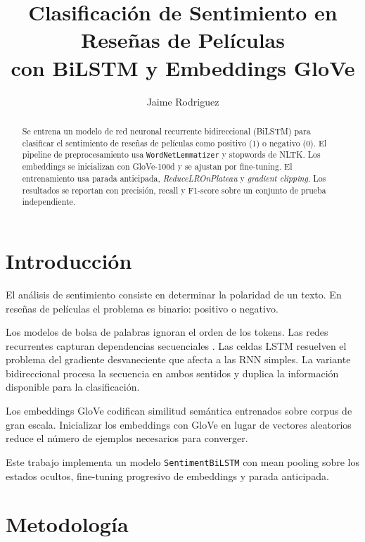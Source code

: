 \documentclass[letterpaper, 10 pt, conference]{ieeeconf}
\title{\LARGE \bf
Clasificaci\'on de Sentimiento en Rese\~nas de Pel\'iculas\\
con BiLSTM y Embeddings GloVe
}
\author{Jaime Rodriguez}
\begin{document}
\maketitle
\thispagestyle{empty}
\pagestyle{empty}

\begin{abstract}
Se entrena un modelo de red neuronal recurrente bidireccional (BiLSTM) para
clasificar el sentimiento de rese\~nas de pel\'iculas como positivo (1) o
negativo (0). El pipeline de preprocesamiento usa \texttt{WordNetLemmatizer}
y stopwords de NLTK. Los embeddings se inicializan con GloVe-100d y se
ajustan por fine-tuning. El entrenamiento usa parada anticipada,
\textit{ReduceLROnPlateau} y \textit{gradient clipping}. Los resultados se
reportan con precisi\'on, recall y F1-score sobre un conjunto de prueba
independiente.
\end{abstract}

\section{Introducci\'on}

El an\'alisis de sentimiento consiste en determinar la polaridad de un texto.
En rese\~nas de pel\'iculas el problema es binario: positivo o negativo.

Los modelos de bolsa de palabras ignoran el orden de los tokens. Las redes
recurrentes capturan dependencias secuenciales \cite{hochreiter1997}. Las
celdas LSTM resuelven el problema del gradiente desvaneciente que afecta a
las RNN simples. La variante bidireccional procesa la secuencia en ambos
sentidos y duplica la informaci\'on disponible para la clasificaci\'on.

Los embeddings GloVe \cite{pennington2014} codifican similitud sem\'antica
entrenados sobre corpus de gran escala. Inicializar los embeddings con GloVe
en lugar de vectores aleatorios reduce el n\'umero de ejemplos necesarios
para converger.

Este trabajo implementa un modelo \texttt{SentimentBiLSTM} con mean pooling
sobre los estados ocultos, fine-tuning progresivo de embeddings y parada
anticipada.

\section{Metodolog\'ia}
\end{document}
